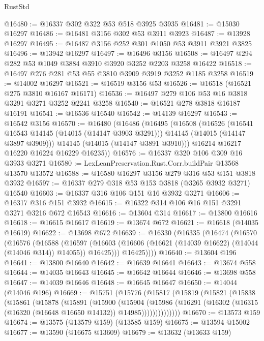 \begin{lexlean}{RustStd}
\begin{coremodule}
@16480 := @16337 @302 @322 @53 @518 @3925 @3935
@16481 := @15030 @16297
@16486 := @16481 @3156 @302 @53 @3911 @3923
@16487 := @13928 @16297
@16495 := @16487 @3156 @252 @301 @1050 @53 @3911 @3921 @3825
@16496 := @13942 @16297
@16497 := @16496 @3156
@16508 := @16497 @294 @282 @53 @1049 @3884 @3910 @3920 @3252 @2203 @3258 @16422
@16518 := @16497 @276 @281 @53 @55 @3810 @3909 @3919 @3252 @1185 @3258
@16519 := @14002 @16297
@16521 := @16519 @3156 @53
@16526 := @16518 (@16521 @275 @3810 @16167 @16171)
@16536 := @16497 @279 @106 @53 @16 @3818 @3291 @3271 @3252 @2241 @3258
@16540 := @16521 @278 @3818 @16187 @16191
@16541 := @16536 @16540
@16542 := @14139 @16297
@16543 := @16542 @3156
@16570 := @16480
    (@16486
      (@16495
        (@16508
          (@16526
            (@16541 @16543 @14145 (@14015 (@14147 @3903 @3291)))
            @14145
            (@14015 (@14147 @3897 @3909)))
          @14145
          (@14015 (@14147 @3891 @3910)))
        @16214
        @16217
        @16220
        @16224
        @16229
        @16235))
@16576 := @16337 @320 @106 @309 @16 @3933 @3271
@16580 := LexLeanPreservation.Rust.Corr.buildPair @13568 @13570 @13572
@16588 := @16580 @16297 @3156 @279 @316 @53 @151 @3818 @3932
@16597 := @16337 @279 @318 @53 @153 @3818 (@3265 @3932 @3271) @16540
@16603 := @16337 @316 @106 @151 @16 @3932 @3271
@16606 := @16317 @316 @151 @3932
@16615 := @16322 @314 @106 @16 @151 @3291 @3271 @3216 @672 @16543
@16616 := @13604 @314
@16617 := @13800 @16616
@16618 := @16615 @16617
@16619 := @13674 @672
@16621 := @16618 (@14035 @16619)
@16622 := @13698 @672
@16639 := @16330
    (@16335
      (@16474
        (@16570
          (@16576
            (@16588
              (@16597
                (@16603 (@16606 (@16621 (@14039 @16622) (@14044 (@14046 @314)) @14055)) @16425)))
            @16425))))
@16640 := @13604 @196
@16641 := @13800 @16640
@16642 := @16639 @16641
@16643 := @13674 @558
@16644 := @14035 @16643
@16645 := @16642 @16644
@16646 := @13698 @558
@16647 := @14039 @16646
@16648 := @16645 @16647
@16650 := @14044 (@14046 @196)
@16669 := @15751
    (@15776
      (@15817
        (@15819
          (@15821
            (@15838
              (@15861
                (@15878
                  (@15891
                    (@15900
                      (@15904
                        (@15986
                          (@16291
                            (@16302 (@16315 (@16320 (@16648 @16650 @14132)) @14985))))))))))))))
@16670 := @13573 @159
@16674 := @13575 (@13579 @159) (@13585 @159)
@16675 := @13594 @15002
@16677 := @13590 (@16675 @13609)
@16679 := @13632 (@13633 @159)

\end{coremodule}
\end{lexlean}

